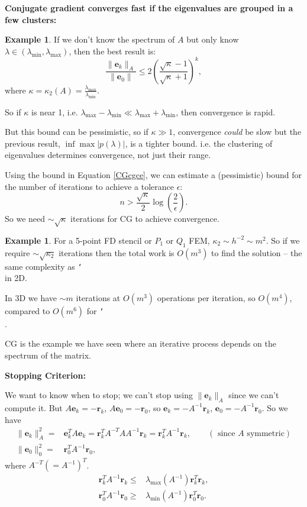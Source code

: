 \documentclass[12pt, a4paper]{article}
\renewcommand{\vec}[1]{\mathbf{#1}}
\theoremstyle{definition}
\newtheorem{example}[thm]{Example}
\theoremstyle{remark}
\numberwithin{equation}{section}
\newcommand\bslash{\char`\\}
\begin{document}
\newpage
{\bf Conjugate gradient converges fast if the eigenvalues are grouped in a few clusters: }

 
 \begin{example}
If we don't know the spectrum of $A$ but only know $\lambda \in (\lambda_{\min},\lambda_{\max})$, then the best result is:
\begin{equation}\label{CGcgce}
\frac{\|\vec{e}_k\|_A}{\|\vec{e}_0\|} \le 2 \left( \frac{\sqrt{\kappa}-1}{\sqrt{\kappa}+1} \right)^k,
\end{equation}
where $\kappa = \kappa_2(A) = \frac{\lambda_{\max}}{\lambda_{\min}}$.
\end{example}

So if $\kappa$ is near 1, i.e. $\lambda_{\max} - \lambda_{\min} \ll \lambda_{\max} + \lambda_{\min}$, then convergence is rapid.

But this bound can be pessimistic,
so if $\kappa \gg 1$, convergence \emph{could} be slow but the previous result, $\inf \max |p(\lambda)|$, is a tighter bound.
i.e. the  clustering of eigenvalues determines convergence, not just their range.

Using the bound in Equation \ref{CGcgce}, we can estimate a (pessimistic) bound for the number of iterations to achieve a tolerance $\epsilon$:
\[n > \frac{\sqrt{\kappa}}{2} \log\left(\frac{2}{\epsilon}\right).\]
So we need $\sim \sqrt{\kappa}$ iterations for CG to achieve convergence. 

\begin{example}
For a 5-point FD stencil or $P_1$ or $Q_1$ FEM, $\kappa_2 \sim h^{-2} \sim m^2$.
So if we require $\sim\sqrt{\kappa_2}$ iterations then the total work is $O(m^3)$ to find the solution -- the same complexity as \texttt{\bslash} in 2D.

In 3D we have $\sim m$ iterations at $O(m^3)$ operations per iteration, so $O(m^4)$, compared to $O(m^6)$ for \texttt{\bslash}.
\end{example}

CG is the  example we have seen  where an iterative process depends on the spectrum of the matrix.
 
\newpage
{\bf Stopping Criterion:}

We want to know when to stop; we can't stop using $\| \vec{e}_k \|_A$ since we can't compute it. 
But $A\vec{e}_k=-\vec{r}_k$, $A\vec{e}_0=-\vec{r}_0$, so $\vec{e}_k=-A^{-1}\vec{r}_k$, $\vec{e}_0=-A^{-1}\vec{r}_0$.
So we have
\begin{align*}
\|\vec{e}_k\|^2_A =& \vec{e}_k^TA\vec{e}_k=\vec{r}_k^TA^{-T}AA^{-1}\vec{r}_k=\vec{r}_k^TA^{-1}\vec{r}_k, \qquad ( \mbox{ since }A \mbox{ symmetric})\\
\|\vec{e}_0\|_0^2 =& \vec{r}_0^T A^{-1}\vec{r}_0,
\end{align*}
where $A^{-T}(=A^{-1})^T$.
\begin{align*}
\vec{r}_k^T A^{-1} \vec{r}_k \le& \lambda_{\max}(A^{-1})\vec{r}_k^T\vec{r}_k,\\
\vec{r}_0^T A^{-1}\vec{r}_0 \ge& \lambda_{\min}(A^{-1})\vec{r}_0^T \vec{r}_0.
\end{align*}
\end{document}
